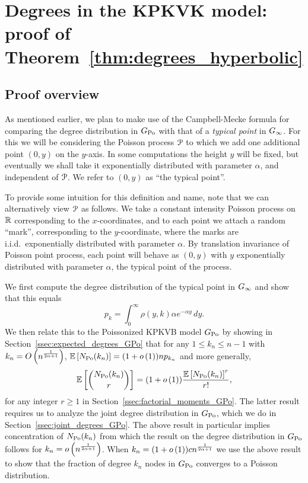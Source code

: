 
\section{Degrees in the KPKVK model: proof of Theorem~\ref{thm:degrees_hyperbolic}}

\subsection{Proof overview}

As mentioned earlier, we plan to make use of the Campbell-Mecke formula for comparing the degree distribution in $G_{{\mathrm{Po}}}$ with that of a \emph{typical point} in $G_{\infty}$. For this we will be considering the Poisson process ${\mathcal P}$ to which we add one additional point $(0,y)$ on the $y$-axis. In some computations the height $y$ will be fixed, but eventually we shall take it exponentially distributed with parameter $\alpha$, and independent of ${\mathcal P}$.
We refer to $(0,y)$ as ``the typical point''.

To provide some intuition for this definition and name, note that we can alternatively view ${\mathcal P}$ as follows. 
We take a constant intensity Poisson process on ${\mathbb R}$ corresponding to the $x$-coordinates, and to each point
we attach a random ``mark'', corresponding to the $y$-coordinate, where the marks are i.i.d.~exponentially distributed with parameter $\alpha$. By translation invariance of Poisson point process, each point will behave as $(0,y)$ with $y$ exponentially distributed with parameter $\alpha$, the typical point of the process.

We first compute the degree distribution of the typical point in $G_{\infty}$ and show that this equals 
\[
	p_k = \int_0^\infty \rho(y,k) \alpha e^{-\alpha y} \, dy.
\]
We then relate this to the Poissonized KPKVB model $G_{{\mathrm{Po}}}$ by showing in Section~\ref{ssec:expected_degrees_GPo} that for any $1 \le k_n \le n -1$ with $k_n = O\left(n^{\frac{1}{2\alpha + 1}}\right)$, $\mathbb{E}\left[N_{{\mathrm{Po}}}(k_n)\right] = (1+o\left(1\right)) n p_{k_n}$ and more generally,
\[
	\mathbb{E}\left[\binom{N_{{\mathrm{Po}}}(k_n)}{r}\right] = (1+o\left(1\right)) \frac{\mathbb{E}\left[N_{{\mathrm{Po}}}(k_n)\right]^r}{r!},
\]
for any integer $r \ge 1$ in Section~\ref{ssec:factorial_moments_GPo}. The latter result requires us to analyze the joint degree distribution in $G_{{\mathrm{Po}}}$, which we do in Section~\ref{ssec:joint_degrees_GPo}. The above result in particular implies concentration of $N_{{\mathrm{Po}}}(k_n)$ from which the result on the degree distribution in $G_{{\mathrm{Po}}}$ follows for $k_n = o\left(n^{\frac{1}{2\alpha + 1}}\right)$. When $k_n = (1+o\left(1\right)) c n^{\frac{1}{2\alpha + 1}}$ we use the above result to show that the fraction of degree $k_n$ nodes in $G_{{\mathrm{Po}}}$ converges to a Poisson distribution. 

